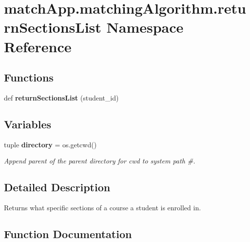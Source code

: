\section{match\+App.\+matching\+Algorithm.\+return\+Sections\+List Namespace Reference}
\label{namespacematch_app_1_1matching_algorithm_1_1return_sections_list}
\subsection*{Functions}
\begin{DoxyCompactItemize}
\item 
def {\bf return\+Sections\+List} (student\+\_\+id)
\end{DoxyCompactItemize}
\subsection*{Variables}
\begin{DoxyCompactItemize}
\item 
tuple {\bf directory} = os.\+getcwd()
\begin{DoxyCompactList}\small\item\em Append parent of the parent directory for cwd to system path \#. \end{DoxyCompactList}\end{DoxyCompactItemize}


\subsection{Detailed Description}
\begin{DoxyVerb}Returns what specific sections of a course a student is enrolled in. \end{DoxyVerb}
 

\subsection{Function Documentation}
